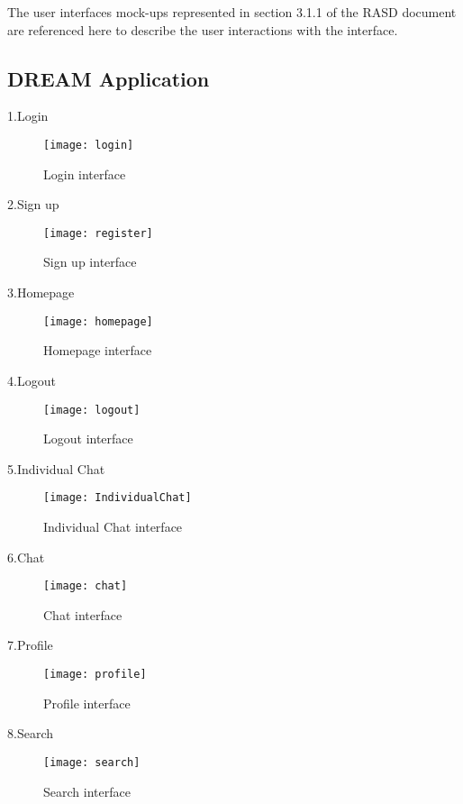\documentclass[../../main.tex]{subfiles}
\begin{document}
The user interfaces mock-ups represented in section 3.1.1 of the RASD document are referenced here to describe the user interactions with the interface.

\subsection{DREAM Application}

1.Login

\begin{figure}[H]
    \centering
    \texttt{[image: login]}
    \caption{
        Login interface
    }
	\end{figure}
	
2.Sign up

\begin{figure}[H]
    \centering
    \texttt{[image: register]}
    \caption{
        Sign up interface
    }
	\end{figure}
	
3.Homepage

\begin{figure}[H]
    \centering
    \texttt{[image: homepage]}
    \caption{
        Homepage interface 
    }
	\end{figure}
	
4.Logout

\begin{figure}[H]
    \centering
    \texttt{[image: logout]}
    \caption{
        Logout interface
    }
	\end{figure}
	
5.Individual Chat

\begin{figure}[H]
    \centering
    \texttt{[image: IndividualChat]}
    \caption{
        Individual Chat interface
    }
	\end{figure}
	
6.Chat

\begin{figure}[H]
    \centering
    \texttt{[image: chat]}
    \caption{
        Chat interface
    }
	\end{figure}
	
7.Profile

\begin{figure}[H]
    \centering
    \texttt{[image: profile]}
    \caption{
        Profile interface
    }
	\end{figure}
	
8.Search

\begin{figure}[H]
    \centering
    \texttt{[image: search]}
    \caption{
        Search interface
    }
	\end{figure}
\end{document}
